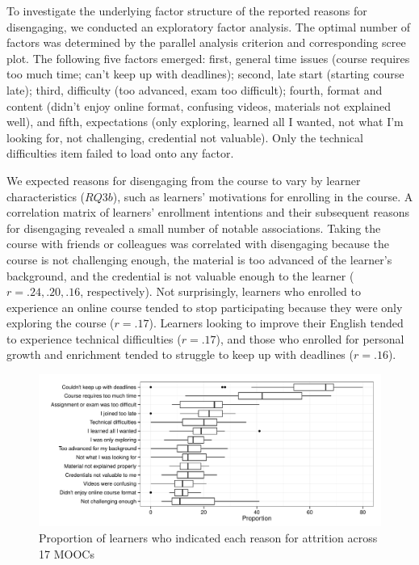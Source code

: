\documentclass{sigchi}\usepackage[]{graphicx}\usepackage[]{color}
\makeatletter
\def\maxwidth{ %
  \ifdim\Gin@nat@width>\linewidth
    \linewidth
  \else
    \Gin@nat@width
  \fi
}
\newenvironment{knitrout}{}{} %
\makeatother
\begin{document}
To investigate the underlying factor structure of the reported reasons for disengaging, we conducted an exploratory factor analysis. The optimal number of factors was determined by the parallel analysis criterion and corresponding scree plot. The following five factors emerged: first, general time issues (course requires too much time; can't keep up with deadlines); second, late start (starting course late); third, difficulty (too advanced, exam too difficult); fourth, format and content (didn't enjoy online format, confusing videos, materials not explained well), and fifth, expectations (only exploring, learned all I wanted, not what I'm looking for, not challenging, credential not valuable). Only the technical difficulties item failed to load onto any factor.

We expected reasons for disengaging from the course to vary by learner characteristics ($RQ3b$), such as learners' motivations for enrolling in the course. A correlation matrix of learners' enrollment intentions and their subsequent reasons for disengaging revealed a small number of notable associations. Taking the course with friends or colleagues was correlated with disengaging because the course is not challenging enough, the material is too advanced of the learner's background, and the credential is not valuable enough to the learner ($r=.24, .20, .16$, respectively). Not surprisingly, learners who enrolled to experience an online course tended to stop participating because they were only exploring the course ($r=.17$). Learners looking to improve their English tended to experience technical difficulties ($r=.17$), and those who enrolled for personal growth and enrichment tended to struggle to keep up with deadlines ($r=.16$).

\begin{knitrout}
\color{fgcolor}\begin{figure}[ht]

\includegraphics[width=\maxwidth]{figure/s1reason} \caption[Proportion of learners who indicated each reason for attrition across 17 MOOCs]{Proportion of learners who indicated each reason for attrition across 17 MOOCs\label{fig:s1reason}}
\end{figure}


\end{knitrout}
\end{document}
